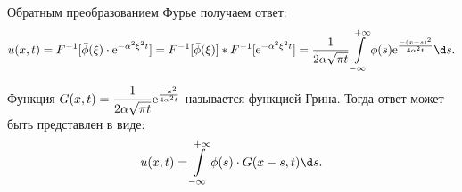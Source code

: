 Обратным преобразованием Фурье получаем ответ:
\[
    u(x, t) = F^{-1}[\bar{\phi}(\xi)\cdot\e^{-\alpha^2\xi^2 t}] =
    F^{-1}[\bar{\phi}(\xi)] * F^{-1}[\e^{-\alpha^2\xi^2 t}] =
    \frac{1}{2\alpha\sqrt{\pi t}} \int\limits_{-\infty}^{+\infty} \phi(s)
    \e^{\frac{-(x-s)^2}{4\alpha^2 t}}\d s.
\]

Функция \( \displaystyle G(x, t) = \frac{1}{2\alpha\sqrt{\pi t}}
\mathrm{e}^{\frac{-x^2}{4\alpha^2 t}} \) называется функцией Грина. Тогда ответ
может быть представлен в виде:
\[
    u(x, t) = \int\limits_{-\infty}^{+\infty} \phi(s)\cdot G(x-s, t)\d s.
\]

\newpage

